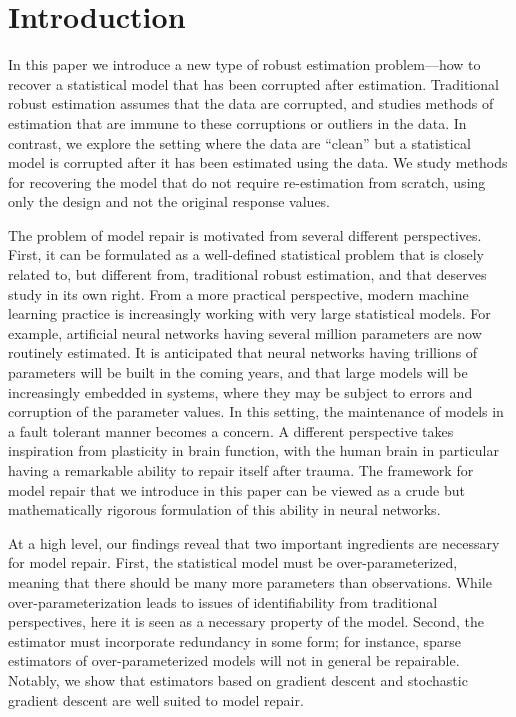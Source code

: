 
\section{Introduction}
\label{sec:intro}

In this paper we introduce a new type of robust estimation problem---how to recover a statistical
model that has been corrupted after estimation. Traditional robust estimation assumes that the data are corrupted, and studies methods of estimation that are immune to these corruptions or outliers in the data.
In contrast, we explore the setting where the data are ``clean'' but a statistical model is corrupted after it has been estimated using the data. We study methods for recovering the model that do not require re-estimation from scratch, using only the design and not the original response values.

The problem of model repair is motivated from several different perspectives. First, it can be formulated as a well-defined statistical problem that is closely related to, but different from, traditional robust estimation, and that deserves study in its own right. From a more practical perspective, modern machine learning practice is increasingly working with very large statistical models. For example, artificial neural networks having several million parameters are now routinely estimated. It is anticipated that neural networks having trillions of parameters will be built in the coming years, and that large models will be increasingly embedded in systems, where they may be subject to errors and corruption of the parameter values. In this setting, the maintenance of models in a fault tolerant manner becomes a concern.  A different perspective takes inspiration from plasticity in brain function, with the human brain in particular having a remarkable ability to repair itself after trauma. The framework for model repair that we introduce in this paper can be viewed as a crude but mathematically rigorous formulation of this ability in neural networks.

At a high level, our findings reveal that two important ingredients are necessary for model repair. First, the statistical model must be over-parameterized, meaning that there should be many more parameters than observations.
While over-parameterization leads to issues of identifiability from traditional perspectives, here it is seen as a necessary property of the model. Second, the estimator must incorporate redundancy in some form; for instance, sparse estimators of over-parameterized models will not in general be repairable. Notably, we show that estimators based on gradient descent and stochastic gradient descent are well suited to model repair.

